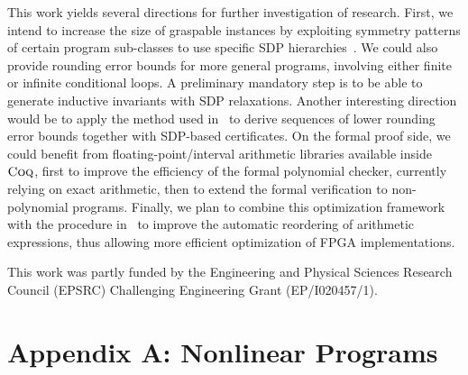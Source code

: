 \documentclass[preprint]{sigplanconf}
\newcommand{\coq}{\text{\sc Coq}}
\theoremstyle{plain}
\begin{document}
This work yields several directions for further investigation of research. 
First, we intend to increase the size of graspable instances by exploiting symmetry patterns of certain program sub-classes to use specific SDP hierarchies~\cite{Riener2013SymmetricSDP}. We could also provide rounding error bounds for more general programs, involving either finite or infinite conditional loops. A preliminary mandatory step is to be able to generate inductive invariants with SDP relaxations. Another interesting direction would be to apply the method used in~\cite{Lasserre11} to derive sequences of lower rounding error bounds together with SDP-based certificates.
On the formal proof side, we could benefit from floating-point/interval arithmetic libraries available inside $\coq$, first to improve the efficiency of the formal polynomial checker, currently relying on exact arithmetic, then to extend the formal verification to non-polynomial programs.
%
Finally, we plan to combine this optimization framework with the procedure in~\cite{Gao15FPGA} to improve the automatic reordering of arithmetic expressions, thus allowing more efficient optimization of FPGA implementations.

\acks
This work was partly funded by the Engineering and Physical Sciences Research Council (EPSRC) Challenging Engineering Grant (EP/I020457/1).
\newpage



\fi

\appendix
\section*{Appendix A: Nonlinear Programs}
\label{sec:appa}
%

\end{document}
